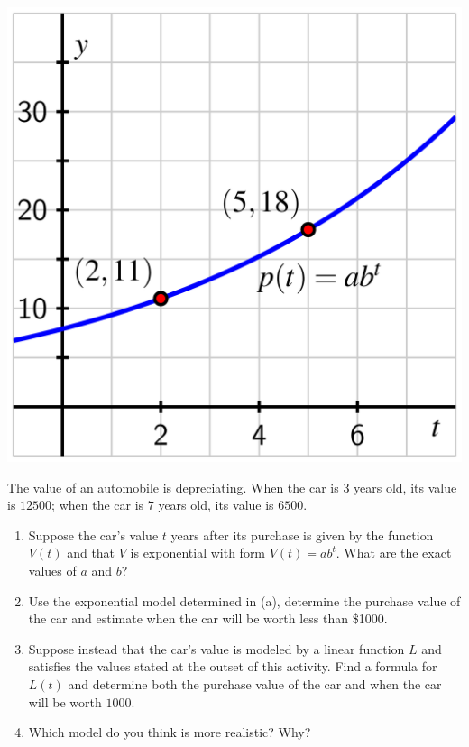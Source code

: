 \documentclass[nooutcomes]{ximera}
\begin{document}
\begin{example}
\begin{explanation}
\begin{image}
\includegraphics{growth-find-a-b.jpg}
\end{image}

\end{explanation}
\end{example}

\begin{exploration}
The value of an automobile is depreciating.  When the car is $3$ years old, its value is \textdollar{}$12500$; when the car is $7$ years old, its value is \textdollar{}$6500$.

\begin{enumerate}[label=\alph*.]
\item Suppose the car's value $t$ years after its purchase is given by the function $V(t)$ and that $V$ is exponential with form $V(t)=ab^t$.  What are the exact values of $a$ and $b$?
\item Use the exponential model determined in (a), determine the purchase value of the car and estimate when the car will be worth less than \$1000.
\item Suppose instead that the car's value is modeled by a linear function $L$ and satisfies the values stated at the outset of this activity.  Find a formula for $L(t)$ and determine both the purchase value of the car and when the car will be worth \textdollar{}$1000$.
\item Which model do you think is more realistic?  Why?
\end{enumerate}
\end{exploration}
\end{document}
